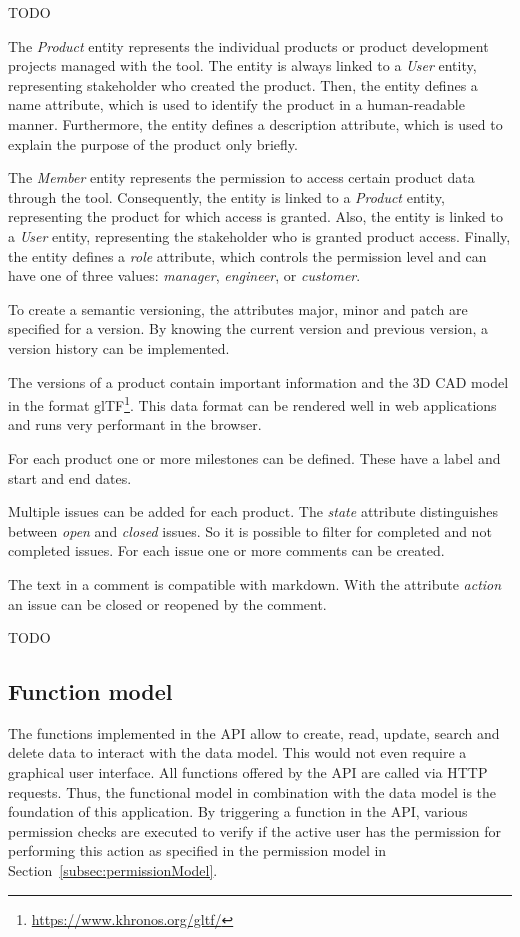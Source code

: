     TODO
    
    The \textit{Product} entity represents the individual products or product development projects managed with the tool.
    The entity is always linked to a \textit{User} entity, representing stakeholder who created the product.
    Then, the entity defines a name attribute, which is used to identify the product in a human-readable manner.
    Furthermore, the entity defines a description attribute, which is used to explain the purpose of the product only briefly.

    The \textit{Member} entity represents the permission to access certain product data through the tool.
    Consequently, the entity is linked to a \textit{Product} entity, representing the product for which access is granted.
    Also, the entity is linked to a \textit{User} entity, representing the stakeholder who is granted product access.
    Finally, the entity defines a \textit{role} attribute, which controls the permission level and can have one of three values: \textit{manager}, \textit{engineer}, or \textit{customer}.

    To create a semantic versioning, the attributes major, minor and patch are specified for a version.
    By knowing the current version and previous version, a version history can be implemented.

    The versions of a product contain important information and the 3D CAD model in the format glTF\footnote{\url{https://www.khronos.org/gltf/}}.
    This data format can be rendered well in web applications and runs very performant in the browser.

    For each product one or more milestones can be defined.
    These have a label and start and end dates.

    Multiple issues can be added for each product.
    The \textit{state} attribute distinguishes between \textit{open} and \textit{closed} issues.
    So it is possible to filter for completed and not completed issues. For each issue one or more comments can be created.

    The text in a comment is compatible with markdown.
    With the attribute \textit{action} an issue can be closed or reopened by the comment.

    TODO

    \subsection*{Function model} 
    The functions implemented in the API allow to create, read, update, search and delete data to interact with the data model. This would not even require a graphical user interface. All functions offered by the API are called via HTTP requests. Thus, the functional model in combination with the data model is the foundation of this application. 
    By triggering a function in the API, various permission checks are executed to verify if the active user has the permission for performing this action as specified in the permission model in Section~\ref{subsec:permissionModel}. 

